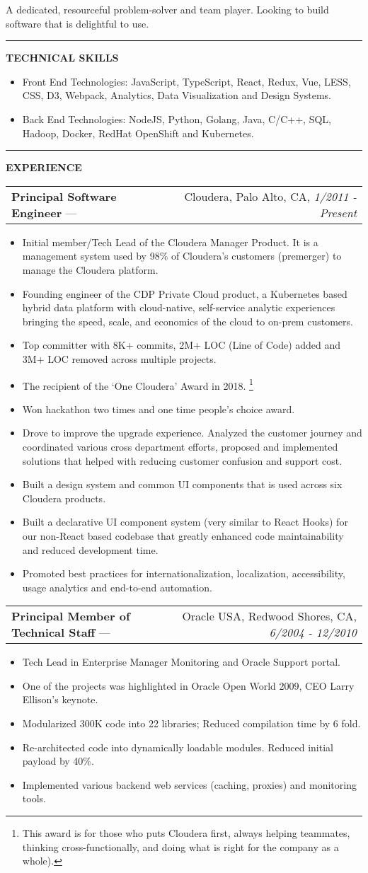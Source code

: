 \documentclass[11pt]{article}
\makeatletter
\newcommand{\resheading}[1]{\vspace{1pt}\textbf{#1}}
\newcommand{\ressubheading}[4]{\vspace{6pt}
    \begin{tabular*}{\textwidth}{@{}l@{\extracolsep{\fill}}r@{}}
        \textbf{#1} --- & #3, #2, \textit{#4} \\
\end{tabular*}}
\newcommand{\resitem}[1]{\item #1}
\newcommand{\ressep}{\vspace{4pt}\hrule\vspace{4pt}}
\makeatother
\begin{document}
A dedicated, resourceful problem-solver and team player. Looking to build software that is delightful to use.

\ressep{}
\resheading{TECHNICAL SKILLS}
\begin{itemize}
\resitem{Front End Technologies: JavaScript, TypeScript, React, Redux, Vue, LESS, CSS, D3, Webpack, Analytics, Data Visualization and Design Systems.}
\resitem{Back End Technologies: NodeJS, Python, Golang, Java, C/C++, SQL, Hadoop, Docker, RedHat OpenShift and Kubernetes.}
\end{itemize}

\ressep{}
\resheading{EXPERIENCE}
\ressubheading{Principal Software Engineer}{Palo Alto, CA}{Cloudera}{1/2011 - Present}
\begin{itemize}
\resitem{Initial member/Tech Lead of the Cloudera Manager Product. It is a management system used by 98\% of Cloudera's customers (premerger) to manage the Cloudera platform.}
\resitem{Founding engineer of the CDP Private Cloud product, a Kubernetes based hybrid data platform with cloud-native, self-service analytic experiences bringing the speed, scale, and economics of the cloud to on-prem customers.}
\resitem{Top committer with 8K+ commits, 2M+ LOC (Line of Code) added and 3M+ LOC removed across multiple projects.}
\resitem{The recipient of the `One Cloudera' Award in 2018. \footnote{This award is for those who puts Cloudera first, always helping teammates, thinking cross-functionally, and doing what is right for the company as a whole).}}
\resitem{Won hackathon two times and one time people's choice award.}
\resitem{Drove to improve the upgrade experience. Analyzed the customer journey and coordinated various cross department efforts, proposed and implemented solutions that helped with reducing customer confusion and support cost.}
\resitem{Built a design system and common UI components that is used across six Cloudera products.}
\resitem{Built a declarative UI component system (very similar to React Hooks) for our non-React based codebase that greatly enhanced code maintainability and reduced development time.}
\resitem{Promoted best practices for internationalization, localization, accessibility, usage analytics and end-to-end automation.}
\end{itemize}

\ressubheading{Principal Member of Technical Staff}{Redwood Shores, CA}{Oracle USA}{6/2004 - 12/2010}
\begin{itemize}
\resitem{Tech Lead in Enterprise Manager Monitoring and Oracle Support portal.}
\resitem{One of the projects was highlighted in Oracle Open World 2009, CEO Larry Ellison's keynote.}
\resitem{Modularized 300K code into 22 libraries; Reduced compilation time by 6 fold.}
\resitem{Re-architected code into dynamically loadable modules. Reduced initial payload by 40\%.}
\resitem{Implemented various backend web services (caching, proxies) and monitoring tools.}
\end{itemize}
\end{document}
